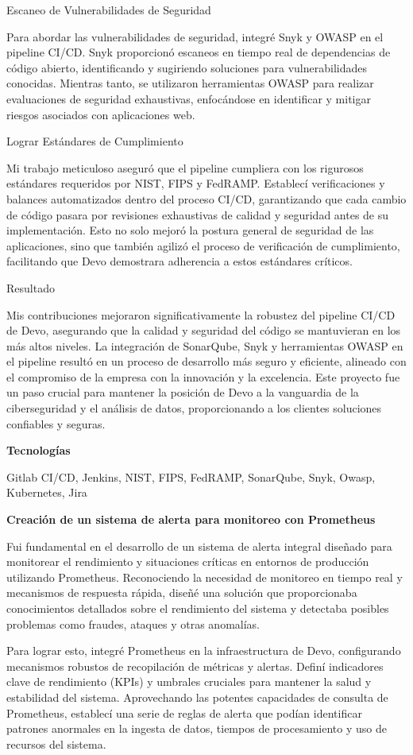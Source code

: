 \documentclass[a4paper,10pt]{article}
\newcommand{\cvsubsubsection}[1]{
\begin{tcolorbox}[colback=gray!10, colframe=gray!10, boxrule=0pt, arc=0mm, outer arc=0mm, width=\textwidth, boxsep=0pt, left=4mm, right=4mm, top=1mm, bottom=1mm]
  \textbf{#1}
\end{tcolorbox}
\vspace{1mm}
}
\newcommand{\cvsubsubsubsection}[1]{
  \begin{tcolorbox}[colback=gray!5, colframe=gray!5, boxrule=0pt, arc=0mm, outer arc=0mm, width=\textwidth, boxsep=0pt, left=6mm, right=6mm, top=1mm, bottom=1mm]
    \textbf{#1}
  \end{tcolorbox}
  \vspace{1mm}
}
\begin{document}
Escaneo de Vulnerabilidades de Seguridad

Para abordar las vulnerabilidades de seguridad, integré Snyk y OWASP en el pipeline CI/CD. Snyk proporcionó escaneos en tiempo real de dependencias de código abierto, identificando y sugiriendo soluciones para vulnerabilidades conocidas. Mientras tanto, se utilizaron herramientas OWASP para realizar evaluaciones de seguridad exhaustivas, enfocándose en identificar y mitigar riesgos asociados con aplicaciones web.

Lograr Estándares de Cumplimiento

Mi trabajo meticuloso aseguró que el pipeline cumpliera con los rigurosos estándares requeridos por NIST, FIPS y FedRAMP. Establecí verificaciones y balances automatizados dentro del proceso CI/CD, garantizando que cada cambio de código pasara por revisiones exhaustivas de calidad y seguridad antes de su implementación. Esto no solo mejoró la postura general de seguridad de las aplicaciones, sino que también agilizó el proceso de verificación de cumplimiento, facilitando que Devo demostrara adherencia a estos estándares críticos.

Resultado

Mis contribuciones mejoraron significativamente la robustez del pipeline CI/CD de Devo, asegurando que la calidad y seguridad del código se mantuvieran en los más altos niveles. La integración de SonarQube, Snyk y herramientas OWASP en el pipeline resultó en un proceso de desarrollo más seguro y eficiente, alineado con el compromiso de la empresa con la innovación y la excelencia. Este proyecto fue un paso crucial para mantener la posición de Devo a la vanguardia de la ciberseguridad y el análisis de datos, proporcionando a los clientes soluciones confiables y seguras.

\cvsubsubsubsection{Tecnologías}
Gitlab CI/CD, Jenkins, NIST, FIPS, FedRAMP, SonarQube, Snyk, Owasp, Kubernetes, Jira

\cvsubsubsection{Creación de un sistema de alerta para monitoreo con Prometheus}
Fui fundamental en el desarrollo de un sistema de alerta integral diseñado para monitorear el rendimiento y situaciones críticas en entornos de producción utilizando Prometheus. Reconociendo la necesidad de monitoreo en tiempo real y mecanismos de respuesta rápida, diseñé una solución que proporcionaba conocimientos detallados sobre el rendimiento del sistema y detectaba posibles problemas como fraudes, ataques y otras anomalías.

Para lograr esto, integré Prometheus en la infraestructura de Devo, configurando mecanismos robustos de recopilación de métricas y alertas. Definí indicadores clave de rendimiento (KPIs) y umbrales cruciales para mantener la salud y estabilidad del sistema. Aprovechando las potentes capacidades de consulta de Prometheus, establecí una serie de reglas de alerta que podían identificar patrones anormales en la ingesta de datos, tiempos de procesamiento y uso de recursos del sistema.
\end{document}
